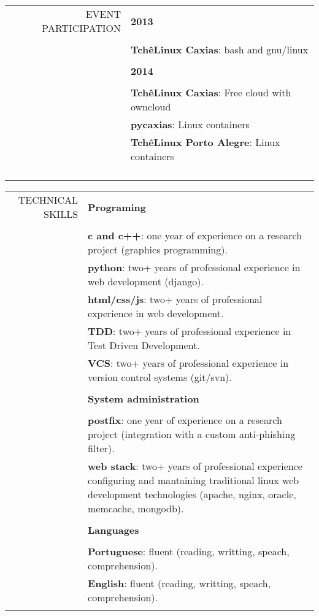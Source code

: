 \documentclass[a4paper, 10pt]{article}
\begin{document}
\begin{tabular}{rp{13cm}}
        EVENT PARTICIPATION
        & \bf 2013 \\\\
        & \textbf{TchêLinux Caxias}: bash and gnu/linux \\\\
        & \bf 2014 \\\\
        & \textbf{TchêLinux Caxias}: Free cloud with owncloud \\
        & \textbf{pycaxias}: Linux containers \\
        & \textbf{TchêLinux Porto Alegre}: Linux containers \\\\\\
        \hline \\\\
    \end{tabular}
    \newpage
    \begin{tabular}{rp{13cm}}
        TECHNICAL SKILLS
        & \bf Programing \\\\
        & \textbf{c and c++}: one year of experience on a research project (graphics programming). \\
        & \textbf{python}: two+ years of professional experience in web development (django). \\
        & \textbf{html/css/js}: two+ years of professional experience in web development. \\
        & \textbf{TDD}: two+ years of professional experience in Test Driven Development. \\
        & \textbf{VCS}: two+ years of professional experience in version control systems (git/svn). \\\\
        & \bf System administration \\\\
        & \textbf{postfix}: one year of experience on a research project (integration with a custom anti-phishing filter). \\
        & \textbf{web stack}: two+ years of professional experience configuring and mantaining traditional linux web development technologies (apache, nginx, oracle, memcache, mongodb). \\\\
        & \bf Languages \\\\
        & \textbf{Portuguese}: fluent (reading, writting, speach, comprehension). \\
        & \textbf{English}: fluent (reading, writting, speach, comprehension). \\\\
        \hline
    \end{tabular}
\end{document}
